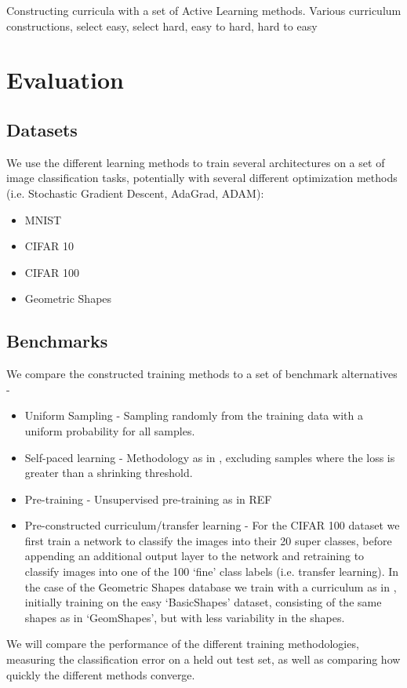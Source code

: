 \documentclass[a4paper,11pt]{article}
\begin{document}
Constructing curricula with a set of Active Learning methods. 
Various curriculum constructions, select easy, select hard, easy to hard, hard to easy

\section{Evaluation}
\subsection*{Datasets}
We use the different learning methods to train several architectures on a set of image classification tasks, potentially with several different optimization methods (i.e. Stochastic Gradient Descent, AdaGrad, ADAM):
\begin{itemize}
	\item MNIST
	\item CIFAR 10
	\item CIFAR 100
	\item Geometric Shapes
\end{itemize}
\subsection*{Benchmarks}
We compare the constructed training methods to a set of benchmark alternatives -
\begin{itemize}
	\item Uniform Sampling - Sampling randomly from the training data with a uniform probability for all samples.
	\item Self-paced learning - Methodology as in \cite{Koller 2010}, excluding samples where the loss is greater than a shrinking threshold.
	\item Pre-training - Unsupervised pre-training as in REF
	\item Pre-constructed curriculum/transfer learning - For the CIFAR 100 dataset we first train a network to classify the images into their 20 super classes, before appending an additional output layer to the network and retraining to classify images into one of the 100 `fine' class labels (i.e. transfer learning). In the case of the Geometric Shapes database we train with a curriculum as in \cite{Bengio 09}, initially training on the easy `BasicShapes' dataset, consisting of the same shapes as in `GeomShapes', but with less variability in the shapes. 
\end{itemize}

We will compare the performance of the different training methodologies, measuring the classification error on a held out test set, as well as comparing how quickly the different methods converge. 
\end{document}
